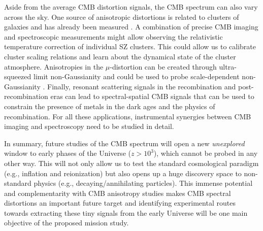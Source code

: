 Aside from the average CMB distortion signals, the CMB spectrum can also vary across the sky. One source of anisotropic distortions is related to clusters of galaxies and has already been measured \citep{Planck2013SZ}. A combination of precise CMB imaging and spectroscopic measurements might allow observing the relativistic temperature correction  \citep{Sazonov1998, Itoh98, Challinor98} of individual SZ clusters. This could allow us to calibrate cluster scaling relations and learn about the dynamical state of the cluster atmosphere. Anisotropies in the $\mu$-distortion can be created through ultra-squeezed limit non-Gaussianity \citep{Pajer2012, Ganc2012} and could be used to probe scale-dependent non-Gaussianity \citep{Biagetti2013, Razi2015}. Finally, resonant scattering signals in the recombination \citep{Jose2005, Carlos2007Pol, Lewis2013} and post-recombination eras \citep{Kaustuv2004, Schleicher2008} can lead to spectral-spatial CMB signals that can be used to constrain the presence of metals in the dark ages and the physics of recombination. For all these applications, instrumental synergies between CMB imaging and spectroscopy need to be studied in detail. 


In summary, future studies of the CMB spectrum will open a new {\it unexplored} window to early phases of the Universe ($z > 10^3$), which cannot be probed in any other way. This will not only allow us to test the standard cosmological paradigm (e.g., inflation and reionization) but also opens up a huge discovery space to non-standard physics (e.g., decaying/annihilating particles). This immense potential and complementarity with CMB anisotropy studies makes CMB spectral distortions an important future target and identifying experimental routes towards extracting these tiny signals from the early Universe will be one main objective of the proposed mission study.

\vspace{-0.15in}
